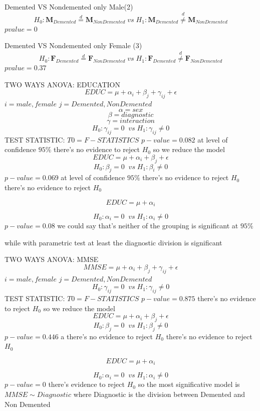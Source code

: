 \documentclass{beamer}
\begin{document}
	\begin{frame}{Demented VS Nondemented only Male(2)}
	$$
	H_0: \mathbf{M}_{Demented} \overset{d}{=} \mathbf{M}_{Non Demented}\;vs\;H_1:\mathbf{M}_{Demented} \overset{d}{\neq} \mathbf{M}_{Non Demented}
	$$
	$pvalue= 0 $
	\end{frame}
	
	\begin{frame}{Demented VS Nondemented only Female (3)}
	$$
	H_0: \mathbf{F}_{Demented} \overset{d}{=} \mathbf{F}_{Non Demented}\;vs\;H_1:\mathbf{F}_{Demented} \overset{d}{\neq} \mathbf{F}_{Non Demented}
	$$
	$pvalue= 0.37 $
		
	\end{frame}
	
	
	\begin{frame}{ TWO WAYS ANOVA: EDUCATION}
 	$$ EDUC =   \mu + \alpha_i + \beta_j + \gamma_{ij} + \epsilon  $$
 	$ i ={male,female}$
 	$ j={ Demented, Non Demented }$
 	$$ \alpha= sex$$
	$$ \beta= diagnostic$$
	$$ \gamma= interaction$$
	$$
	H_0: \gamma_{ij}=0\; \;vs\;H_1:\gamma_{ij}\neq0 
	$$
	TEST STATISTIC: $ T0= F-STATISTICS $
	$p-value = 0.082 $
	at level of confidence $ 95\% $ there's no evidence to	reject $H_0$ 
	so we reduce the model
	$$ EDUC =  \mu + \alpha_i + \beta_j  + \epsilon $$
		$$
	H_0: \beta_j=0\; \;vs\;H_1:\beta_i\neq0 
	$$
	$p-value = 0.069$
	at level of confidence $ 95\% $ there's no evidence to	reject $H_0$ there's no  evidence to reject $H_0$ 
	
	$$ EDUC =  \mu + \alpha_i  $$
	
		$$
	H_0:\alpha_i=0\; \;vs\;H_1:\alpha_i\neq0
	$$
	$p-value = 0.08 $
we could say that's neither of the grouping is significant at $95\%$ 

while with parametric test at least the diagnostic division is significant
\end{frame}
	\begin{frame}{ TWO WAYS ANOVA: MMSE}
	$$ MMSE =   \mu + \alpha_i + \beta_j + \gamma_{ij} + \epsilon $$
		$ i ={male,female}$
	$ j={ Demented, Non Demented }$
	$$
	H_0: \gamma_{ij}=0\; \;vs\;H_1:\gamma_{ij}\neq0 
	$$
	TEST STATISTIC: $ T0= F-STATISTICS $
	$p-value = 0.875 $
	there's no evidence to	reject $H_0$ 
	so we reduce the model
	$$ EDUC =   \mu + \alpha_i + \beta_j  + \epsilon  $$
	$$
	H_0:\beta_j=0\; \;vs\;H_1:\beta_j\neq0 
	$$
	$p-value = 0.446$
	a there's no evidence to reject $H_0$ there's no  evidence to reject $H_0$ 
	
	$$ EDUC =  \mu + \alpha_i $$
	
	$$
	H_0: \alpha_i =0\; \;vs\;H_1:\alpha_i \neq0 
	$$
	$p-value = 0$
	there's evidence to reject $H_0 $ 
	so the most significative model is $ MMSE \sim Diagnostic$
	where Diagnostic is the division between Demented and Non Demented
	\end{frame}
	
\end{document}
